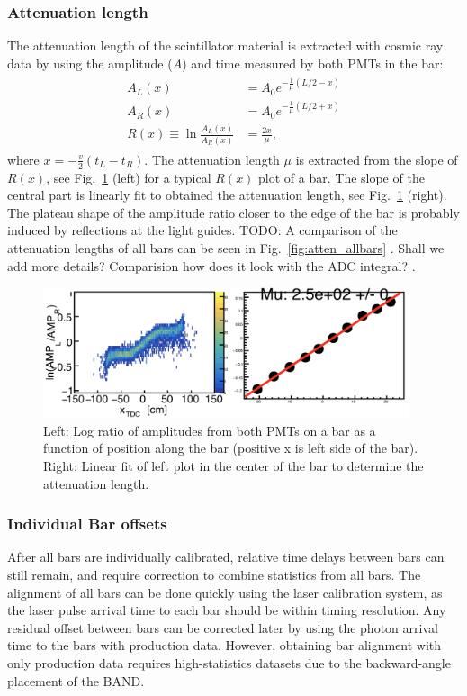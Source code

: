 \documentclass[3p,final,twocolumn]{elsarticle}
\begin{document}
\subsubsection{Attenuation length}
The attenuation length of the scintillator material is extracted with cosmic ray data by using the 
amplitude ($A$) and time measured by both PMTs in the bar:
\begin{eqnarray}
	\begin{split}
		A_L(x) &= A_0 e^{-\frac{1}{\mu}\left(L/2-x\right) }				\\
		A_R(x) &= A_0 e^{-\frac{1}{\mu}\left(L/2+x\right) }				\\
		R(x) \equiv \ln{\frac{A_L(x)}{A_R(x)}} &= \frac{2x}{\mu},					
		 \label{eqn:atten}
	\end{split}
\end{eqnarray}
where $x=-\frac{v}{2}(t_L - t_R)$. The attenuation length $\mu$ is extracted from the slope of $R(x)$, see Fig.~\ref{fig:atten} (left) for a typical $R(x)$ plot of a bar.
The slope of the central part is linearly fit to obtained the attenuation length, see Fig.~\ref{fig:atten} (right). 
The plateau shape of the amplitude ratio closer to the edge of the bar is probably induced by reflections at the light guides.   
 {\color{red} TODO: A comparison of the attenuation lengths of all bars can be seen in Fig.~\ref{fig:atten_allbars} }.
 {\color{red} Shall we add more details?  Comparision how does it look with the ADC integral? }.
\begin{figure}[h!]
	\centering
		\includegraphics[width=0.96\textwidth]{atten.png}
	\caption{Left: Log ratio of amplitudes from both PMTs on a bar as a function of position along the bar (positive x is left side of the bar). Right: Linear fit of left plot in the center of the bar to determine the attenuation length.}
	\label{fig:atten}
\end{figure}

\subsubsection{Individual Bar offsets}
After all bars are individually calibrated, relative time delays between bars can still remain, and require correction to combine 
statistics from all bars. The alignment of all bars can be done quickly using the laser calibration system, as the laser pulse arrival 
time to each bar should be within timing resolution. Any residual offset 
between bars can be corrected later by using the photon arrival time to the bars with production data. 
However, obtaining bar alignment with only production data 
requires high-statistics datasets due to the backward-angle placement of the BAND. 
\end{document}
